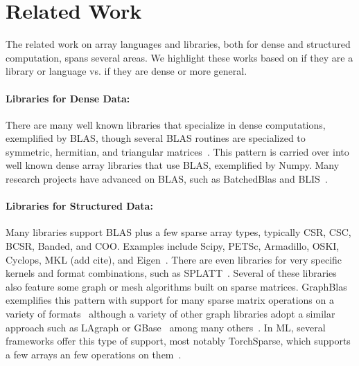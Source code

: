 \section{Related Work}

The related work on array languages and libraries, both for dense and structured computation, spans several areas.
%
We highlight these works based on if they are a library or language vs. if they are dense or more general.

\paragraph{Libraries for Dense Data:} There are many well known libraries that specialize in dense computations, exemplified by BLAS, though several BLAS routines are specialized to symmetric, hermitian, and triangular matrices~\cite{Anderson1999}.
%
This pattern is carried over into well known dense array libraries that use BLAS, exemplified by Numpy.
%
Many research projects have advanced on BLAS, such as BatchedBlas and BLIS~\cite{dongarra2017design, van2015blis}.

\paragraph{Libraries for Structured Data:}

Many libraries support BLAS plus a few sparse array types, typically CSR, CSC, BCSR, Banded, and COO.
%
Examples include Scipy, PETSc, Armadillo, OSKI, Cyclops, MKL (add cite), and Eigen~\cite{virtanen2020scipy, abhyankarpetsc, Rumengan2021, vuduc2005oski,solomonik2013cyclops, eigenweb}.
%
There are even libraries for very specific kernels and format combinations, such as SPLATT~\cite{smith2015splatt}.
%
Several of these libraries also feature some graph or mesh algorithms built on sparse matrices.
%
GraphBlas exemplifies this pattern with support for many sparse matrix operations on a variety of formats~\cite{kepner2016mathematical} although a variety of other graph libraries adopt a similar approach such as LAgraph or GBase~\cite{mattson2019lagraph, kang2011gbase} among many others~\cite{ashari2014fast,huang2020ge}.
%
In ML, several frameworks offer this type of support, most notably TorchSparse, which supports a few arrays an few operations on them~\cite{tang2022torchsparse, tang2023torchsparse++}.
%

